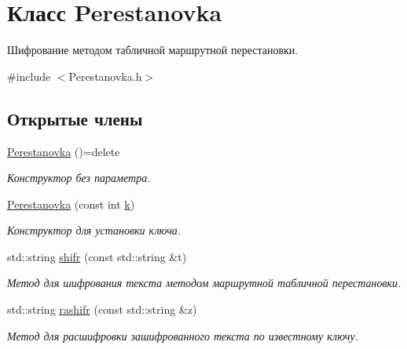 \hypertarget{classPerestanovka}{}\section{Класс Perestanovka}
\label{classPerestanovka}


Шифрование методом табличной маршрутной перестановки.  




{\ttfamily \#include $<$Perestanovka.\+h$>$}

\subsection*{Открытые члены}
\begin{DoxyCompactItemize}
\item 
\hyperlink{classPerestanovka_aa911a70c97003bd545ed52a4832c3d2b}{Perestanovka} ()=delete
\begin{DoxyCompactList}\small\item\em Конструктор без параметра. \end{DoxyCompactList}\item 
\hyperlink{classPerestanovka_a376d268a9c582ad2732d5013dc3ff08b}{Perestanovka} (const int \hyperlink{classPerestanovka_a7bd5d0e646ddcc4436dc058f505916c1}{k})
\begin{DoxyCompactList}\small\item\em Конструктор для установки ключа. \end{DoxyCompactList}\item 
std\+::string \hyperlink{classPerestanovka_a95ea7acda9a02a89903e4058a664fbcd}{shifr} (const std\+::string \&t)
\begin{DoxyCompactList}\small\item\em Метод для шифрования текста методом маршрутной табличной перестановки. \end{DoxyCompactList}\item 
std\+::string \hyperlink{classPerestanovka_ac0c30a5771b3de3c9bd2dde54cc93688}{rashifr} (const std\+::string \&z)
\begin{DoxyCompactList}\small\item\em Метод для расшифровки зашифрованного текста по известному ключу. \end{DoxyCompactList}\end{DoxyCompactItemize}
